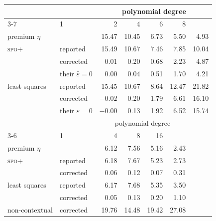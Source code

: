 \begin{tabular}{llrrrrr}
\toprule
& & \multicolumn{5}{c}{polynomial degree} \\
\cmidrule(lr){3-7}
\multicolumn{2}{l}{\textbf{Shortest path}, \(n = 5000\), \(\bar\varepsilon = 0.5\)}
  & 1 & 2 & 4 & 6 & 8 \\
\midrule
\multicolumn{2}{l}{premium \(\eta\)} & 15.47 & 10.45 & 6.73 & 5.50 & 4.93 \\
\addlinespace
\textsc{spo+}   & reported  & 15.49 & 10.67 & 7.46 & 7.85 & 10.04 \\
        & corrected & 0.01 & 0.20 & 0.68 & 2.23 & 4.87 \\
        & their \(\bar\varepsilon = 0\) & 0.00 & 0.04 & 0.51 & 1.70 & 4.21 \\
\addlinespace
least squares   & reported  & 15.45 & 10.67 & 8.64 & 12.47 & 21.82 \\
        & corrected & $-0.02$ & 0.20 & 1.79 & 6.61 & 16.10 \\
        & their \(\bar\varepsilon = 0\) & $-0.00$ & 0.13 & 1.92 & 6.52 & 15.74 \\
\midrule
& & \multicolumn{4}{c}{polynomial degree} \\
\cmidrule(lr){3-6}
\multicolumn{2}{l}{\textbf{Portfolio}, \(n = 1000\), \(\tau = 2\)}
  & 1 & 4 & 8 & 16 & \\
\midrule
\multicolumn{2}{l}{premium \(\eta\)} & 6.12 & 7.56 & 5.16 & 2.43 & \\
\addlinespace
\textsc{spo+}   & reported  & 6.18 & 7.67 & 5.23 & 2.73 & \\
        & corrected & 0.06 & 0.12 & 0.07 & 0.31 & \\
\addlinespace
least squares   & reported  & 6.17 & 7.68 & 5.35 & 3.50 & \\
        & corrected & 0.05 & 0.13 & 0.20 & 1.10 & \\
\addlinespace
non-contextual & corrected & 19.76 & 14.48 & 19.42 & 27.08 & \\
\bottomrule
\end{tabular}
